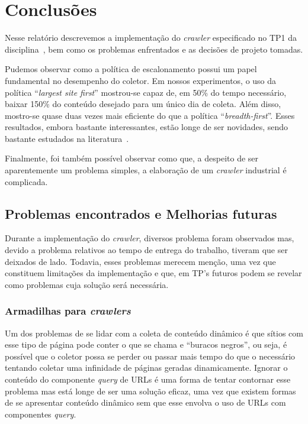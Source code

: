 \documentclass[10pt,twocolumn]{article}
\begin{document}
\section{Conclusões}

Nesse relatório descrevemos a implementação do \emph{crawler}
especificado no TP1 da disciplina~\cite{tp1}, bem como os problemas
enfrentados e as decisões de projeto tomadas.

Pudemos observar como a política de escalonamento possui um papel
fundamental no desempenho do coletor. Em nossos experimentos, o
uso da política ``\emph{largest site first}'' mostrou-se capaz de, em
50\% do tempo necessário, baixar 150\% do conteúdo desejado para um
único dia de coleta. Além disso, mostro-se quase duas vezes mais eficiente do que a
política ``\emph{breadth-first}''. Esses resultados, embora bastante
interessantes, estão longe de ser novidades, sendo bastante estudados na
literatura~\cite{baezayates2005crawling}.


Finalmente, foi também possível observar como que, a despeito de ser
aparentemente um problema simples, a elaboração de um \emph{crawler}
industrial é complicada.

\subsection{Problemas encontrados e Melhorias
futuras}\label{sec:problemas}

Durante a implementação do \emph{crawler}, diversos problema foram
observados mas, devido a problema relativos ao tempo de entrega do
trabalho, tiveram que ser deixados de lado. Todavia, esses problemas
merecem menção, uma vez que constituem limitações da implementação e
que, em TP's futuros podem se revelar como problemas cuja solução será
necessária.

\subsubsection{Armadilhas para \emph{crawlers}}\label{dif:armadilhas}

Um dos problemas de se lidar com a coleta de conteúdo dinâmico é que
sítios com esse tipo de página pode conter o que se chama e ``buracos
negros'', ou seja, é possível que o coletor possa se perder ou passar
mais tempo do que o necessário tentando coletar uma
infinidade de páginas geradas dinamicamente. Ignorar o conteúdo do
componente \emph{query} de URLs é uma forma de tentar contornar esse
problema mas está longe de ser uma solução eficaz, uma vez que existem
formas de se apresentar conteúdo dinâmico sem que esse envolva o uso de
URLs com componentes \emph{query}.
\end{document}
